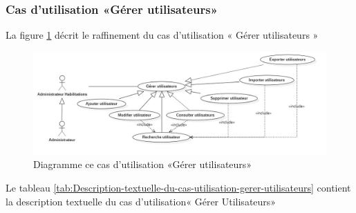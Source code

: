\subsubsection{Cas d’utilisation «Gérer utilisateurs»}
La figure \ref{fig:usecase-gestion-users} décrit le raffinement du cas d’utilisation « Gérer utilisateurs »
\begin{figure}[H]
	\centering
	\includegraphics[width=1\linewidth]{"img/conception/usecases/sprint 1/usecase-gestion-users"}
	\caption[Cas d’utilisation «Gérer utilisateurs»]{Diagramme ce cas d’utilisation «Gérer utilisateurs»}
	\label{fig:usecase-gestion-users}
\end{figure}
Le tableau \ref{tab:Description-textuelle-du-cas-utilisation-gerer-utilisateurs} contient la description textuelle du cas d’utilisation« Gérer Utilisateurs»\\

